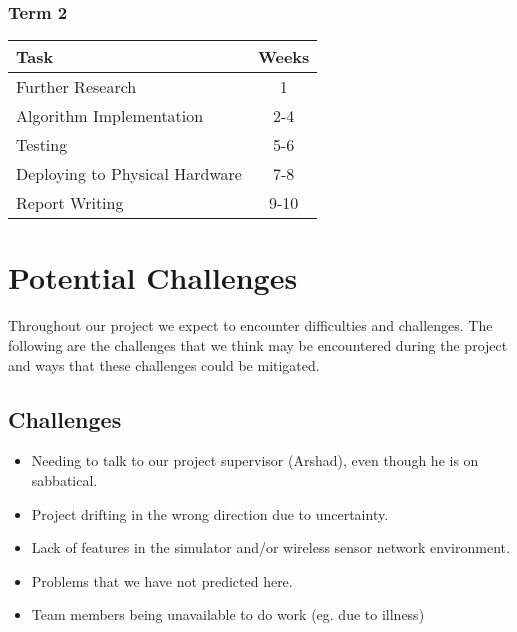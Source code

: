 \documentclass[a4paper]{article}
\begin{document}
\subsubsection{Term 2}

\begin{table}[H]
	\centering
	\begin{tabular}{| l | c |}
	\hline
	\textbf{Task} & \textbf{Weeks}\\
	\hline
	Further Research & 1\\
	\hline
	Algorithm Implementation & 2-4\\
	\hline
	Testing & 5-6\\
	\hline
	Deploying to Physical Hardware & 7-8\\
	\hline
	Report Writing & 9-10\\
	\hline
	\end{tabular}
\end{table}



\section{Potential Challenges}

Throughout our project we expect to encounter difficulties and challenges. The following are the challenges that we think may be encountered during the project and ways that these challenges could be mitigated.


\subsection{Challenges}
\begin{itemize}
	\item Needing to talk to our project supervisor (Arshad), even though he is on sabbatical.
	\item Project drifting in the wrong direction due to uncertainty.
	\item Lack of features in the simulator and/or wireless sensor network environment.
	\item Problems that we have not predicted here.
	\item Team members being unavailable to do work (eg. due to illness)
\end{itemize}
\end{document}
